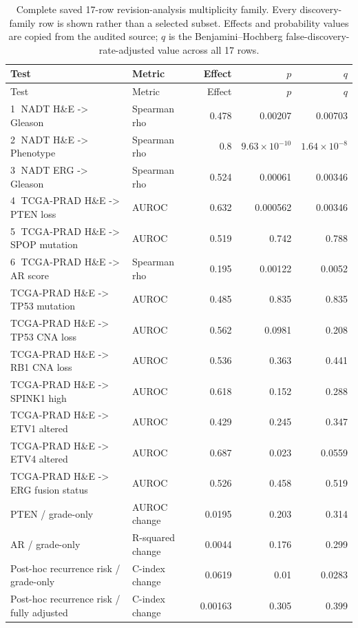 \begingroup
\small
\begin{longtable}{@{}p{}p{}rrr@{}}
\caption{Complete saved 17-row revision-analysis multiplicity family. Every discovery-family row is shown rather than a selected subset. Effects and probability values are copied from the audited source; $q$ is the Benjamini--Hochberg false-discovery-rate-adjusted value across all 17 rows.}
\label{tab:supp-family}\\
\toprule
Test & Metric & Effect & $p$ & $q$ \\
\midrule
\endfirsthead
\toprule
Test & Metric & Effect & $p$ & $q$ \\
\midrule
\endhead
\textcircled{1} NADT H\&E -> Gleason & Spearman rho & 0.478 & 0.00207 & 0.00703 \\
\textcircled{2} NADT H\&E -> Phenotype & Spearman rho & 0.8 & $9.63\times10^{-10}$ & $1.64\times10^{-8}$ \\
\textcircled{3} NADT ERG -> Gleason & Spearman rho & 0.524 & 0.00061 & 0.00346 \\
\textcircled{4} TCGA-PRAD H\&E -> PTEN loss & AUROC & 0.632 & 0.000562 & 0.00346 \\
\textcircled{5} TCGA-PRAD H\&E -> SPOP mutation & AUROC & 0.519 & 0.742 & 0.788 \\
\textcircled{6} TCGA-PRAD H\&E -> AR score & Spearman rho & 0.195 & 0.00122 & 0.0052 \\
TCGA-PRAD H\&E -> TP53 mutation & AUROC & 0.485 & 0.835 & 0.835 \\
TCGA-PRAD H\&E -> TP53 CNA loss & AUROC & 0.562 & 0.0981 & 0.208 \\
TCGA-PRAD H\&E -> RB1 CNA loss & AUROC & 0.536 & 0.363 & 0.441 \\
TCGA-PRAD H\&E -> SPINK1 high & AUROC & 0.618 & 0.152 & 0.288 \\
TCGA-PRAD H\&E -> ETV1 altered & AUROC & 0.429 & 0.245 & 0.347 \\
TCGA-PRAD H\&E -> ETV4 altered & AUROC & 0.687 & 0.023 & 0.0559 \\
TCGA-PRAD H\&E -> ERG fusion status & AUROC & 0.526 & 0.458 & 0.519 \\
PTEN / grade-only & AUROC change & 0.0195 & 0.203 & 0.314 \\
AR / grade-only & R-squared change & 0.0044 & 0.176 & 0.299 \\
Post-hoc recurrence risk / grade-only & C-index change & 0.0619 & 0.01 & 0.0283 \\
Post-hoc recurrence risk / fully adjusted & C-index change & 0.00163 & 0.305 & 0.399 \\
\bottomrule
\end{longtable}
\endgroup
